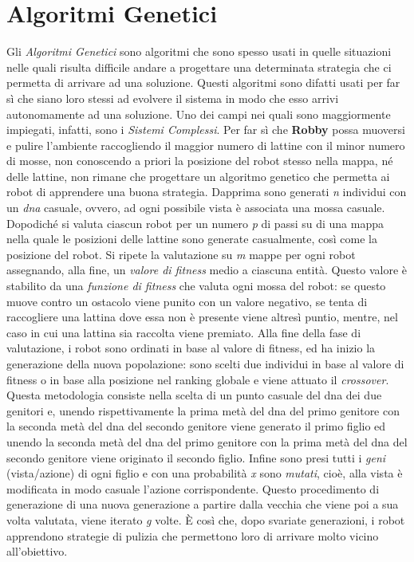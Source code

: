 \section{Algoritmi Genetici}
Gli \textit{Algoritmi Genetici} sono algoritmi che sono spesso usati in quelle
situazioni nelle quali risulta difficile andare a progettare una determinata
strategia che ci permetta di arrivare ad una soluzione.\newline
Questi algoritmi sono difatti usati per far sì che siano loro stessi ad evolvere
il sistema in modo che esso arrivi autonomamente ad una soluzione.\newline
Uno dei campi nei quali sono maggiormente impiegati, infatti, sono i
\textit{Sistemi Complessi}.\newline
Per far sì che \textbf{Robby} possa muoversi e pulire l'ambiente raccogliendo il
maggior numero di lattine con il minor numero di mosse, non conoscendo a priori
la posizione del robot stesso nella mappa, né delle lattine, non rimane che
progettare un algoritmo genetico che permetta ai robot di apprendere una buona
strategia.\newline
Dapprima sono generati \textit{n} individui con un \textit{dna} casuale, ovvero,
ad ogni possibile vista è associata una mossa casuale. Dopodiché si valuta
ciascun robot per un numero \textit{p} di passi su di una mappa nella quale le
posizioni delle lattine sono generate casualmente, così come la posizione del
robot. Si ripete la valutazione su \textit{m} mappe per ogni robot assegnando,
alla fine, un \textit{valore di fitness} medio a ciascuna entità. Questo valore
è stabilito da una \textit{funzione di fitness} che valuta ogni mossa del robot:
se questo muove contro un ostacolo viene punito con un valore negativo, se tenta
di raccogliere una lattina dove essa non è presente viene altresì puntio,
mentre, nel caso in cui una lattina sia raccolta viene premiato. Alla fine della
fase di valutazione, i robot sono ordinati in base al valore di fitness, ed ha
inizio la generazione della nuova popolazione: sono scelti due individui in base
al valore di fitness o in base alla posizione nel ranking globale e viene
attuato il \textit{crossover}. Questa metodologia consiste nella scelta di un
punto casuale del dna dei due genitori e, unendo rispettivamente la prima metà
del dna del primo genitore con la seconda metà del dna del secondo genitore
viene generato il primo figlio ed unendo la seconda metà del dna del primo
genitore con la prima metà del dna del secondo genitore viene originato il
secondo figlio. Infine sono presi tutti i \textit{geni} (vista/azione) di ogni
figlio e con una probabilità \textit{x} sono \textit{mutati}, cioè, alla vista
è modificata in modo casuale l'azione corrispondente. Questo procedimento di
generazione di una nuova generazione a partire dalla vecchia che viene poi a sua
volta valutata, viene iterato \textit{g} volte. È così che, dopo svariate
generazioni, i robot apprendono strategie di pulizia che permettono loro di
arrivare molto vicino all'obiettivo.
